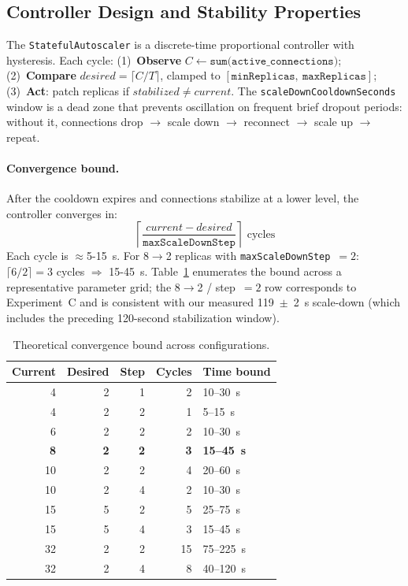 \documentclass[3p,twocolumn]{elsarticle}
\theoremstyle{plain}%
\theoremstyle{definition}%
\begin{document}
\subsection{Controller Design and Stability Properties}
\label{sec:controller_stability}

The \texttt{StatefulAutoscaler} is a discrete-time proportional controller with hysteresis. Each cycle: (1)~\textbf{Observe} $C \gets \texttt{sum(active\_connections)}$; (2)~\textbf{Compare} $desired = \lceil C / T \rceil$, clamped to $[\texttt{minReplicas},\ \texttt{maxReplicas}]$; (3)~\textbf{Act}: patch replicas if $stabilized \neq current$. The \texttt{scaleDownCooldownSeconds} window is a dead zone that prevents oscillation on frequent brief dropout periods: without it, connections drop $\to$ scale down $\to$ reconnect $\to$ scale up $\to$ repeat.

\paragraph{Convergence bound.}
After the cooldown expires and connections stabilize at a lower level, the controller converges in:
\begin{equation}
\left\lceil \frac{current - desired}{\texttt{maxScaleDownStep}} \right\rceil \text{ cycles}
\label{eq:convergence}
\end{equation}
Each cycle is $\approx$5-15~s. For 8$\to$2 replicas with \texttt{maxScaleDownStep}~$= 2$: $\lceil6/2\rceil = 3$ cycles $\Rightarrow$ 15-45~s. Table~\ref{tab:convergence_sweep} enumerates the bound across a representative parameter grid; the 8$\to$2 / step~$=2$ row corresponds to Experiment~C and is consistent with our measured 119~$\pm$~2~s scale-down (which includes the preceding 120-second stabilization window).

\begin{table}[!ht]
\centering
\caption{Theoretical convergence bound across configurations.}
\label{tab:convergence_sweep}
\small
\begin{tabular}{@{}rrrrl@{}}
\toprule
\rowcolor{gray!12}
\textbf{Current} & \textbf{Desired} & \textbf{Step} & \textbf{Cycles} & \textbf{Time bound} \\
\midrule
4 & 2 & 1 & 2 & 10--30~s \\
4 & 2 & 2 & 1 & 5--15~s \\
6 & 2 & 2 & 2 & 10--30~s \\
\textbf{8} & \textbf{2} & \textbf{2} & \textbf{3} & \textbf{15--45~s} \\
10 & 2 & 2 & 4 & 20--60~s \\
10 & 2 & 4 & 2 & 10--30~s \\
15 & 5 & 2 & 5 & 25--75~s \\
15 & 5 & 4 & 3 & 15--45~s \\
32 & 2 & 2 & 15 & 75--225~s \\
32 & 2 & 4 & 8 & 40--120~s \\
\bottomrule
\end{tabular}
\end{table}
\end{document}
